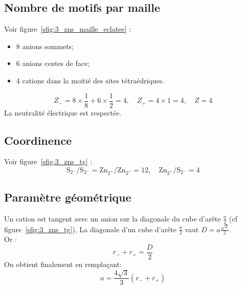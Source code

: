 \subsection{Nombre de motifs par maille}
Voir figure~\ref{sfig:3_zns_maille_eclatee} :
\begin{itemize}
    \item 8 anions sommets;
    \item 6 anions centes de face;
    \item 4 cations dans la moitié des sites tétraédriques.
\end{itemize}
\begin{equation}
    Z_- = 8 \times \frac{1}{8} + 6 \times \frac{1}{2} = 4,\quad
    Z_+ = 4 \times 1 = 4, \quad
    Z = 4
\end{equation}
La neutralité électrique est respectée.

\subsection{Coordinence}
Voir figure~\ref{sfig:3_zns_tg} :\\
\begin{equation}
    \text{S}_{2^-}/\text{S}_{2^-} = \text{Zn}_{2^+}/\text{Zn}_{2^+} = 12,\quad
    \text{Zn}_{2^+}/\text{S}_{2^-} = 4
\end{equation}


\subsection{Paramètre géométrique}
Un cation est tangent avec un anion sur la diagonale du cube d'arête $\frac{a}{2}$
(cf figure~\ref{sfig:3_zns_tg}),
La diagonale d'un cube d'arête $\frac{a}{2}$ vaut $D = a\frac{\sqrt{3}}{2}$.\\
Or :
\begin{equation}
    r_- + r_+ = \frac{D}{2}
\end{equation}
On obtient finalement en remplaçant:
\begin{equation}
    \boxed{a = \frac{4\sqrt{3}}{3}(r_- + r_+)}
    \label{eq:3_zns_ar+r-}
\end{equation}


